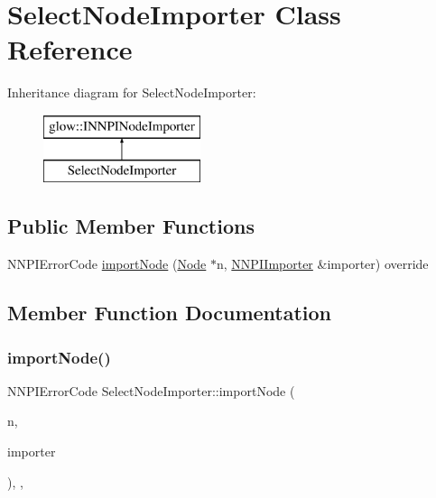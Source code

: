 \hypertarget{class_select_node_importer}{}\section{Select\+Node\+Importer Class Reference}
\label{class_select_node_importer}
Inheritance diagram for Select\+Node\+Importer\+:\begin{figure}[H]
\begin{center}
\leavevmode
\includegraphics[height=2.000000cm]{class_select_node_importer}
\end{center}
\end{figure}
\subsection*{Public Member Functions}
\begin{DoxyCompactItemize}
\item 
N\+N\+P\+I\+Error\+Code \hyperlink{class_select_node_importer_a366114659d26aa7cd41f1e1430dd8c58}{import\+Node} (\hyperlink{classglow_1_1_node}{Node} $\ast$n, \hyperlink{classglow_1_1_n_n_p_i_importer}{N\+N\+P\+I\+Importer} \&importer) override
\end{DoxyCompactItemize}


\subsection{Member Function Documentation}
\mbox{\label{class_select_node_importer_a366114659d26aa7cd41f1e1430dd8c58}} 
\subsubsection{\texorpdfstring{import\+Node()}{importNode()}}
{\footnotesize\ttfamily N\+N\+P\+I\+Error\+Code Select\+Node\+Importer\+::import\+Node (\begin{DoxyParamCaption}\item[{\hyperlink{classglow_1_1_node}{Node} $\ast$}]{n,  }\item[{\hyperlink{classglow_1_1_n_n_p_i_importer}{N\+N\+P\+I\+Importer} \&}]{importer }\end{DoxyParamCaption})\hspace{0.3cm}{\ttfamily [inline]}, {\ttfamily [override]}, {\ttfamily [virtual]}}

